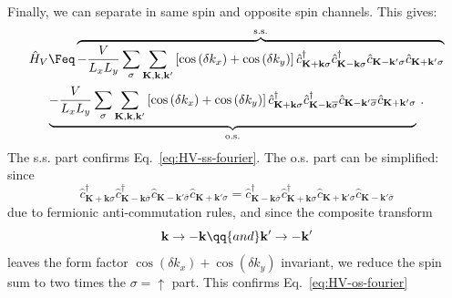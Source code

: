 \begin{tabproof}
	Finally, we can separate in same spin and opposite spin channels. This gives:
	\begin{multline*}
		\hat H_V \Feq 
		\overbrace{
			- \frac{V}{L_x L_y} \sum_{\sigma}
			\sum_{\mathbf{K}, \mathbf{k}, \mathbf{k}'} \left[
			\cos \left(
			\delta k_x
			\right)	+ \cos \left(
			\delta k_y
			\right)	
			\right]	\hat c_{\mathbf{K}+\mathbf{k} \sigma}^\dagger \hat c_{\mathbf{K}-\mathbf{k}\sigma}^\dagger \hat c_{\mathbf{K}-\mathbf{k}'\sigma} \hat c_{\mathbf{K}+\mathbf{k}'\sigma}
		}^{\mathrm{s.s.}} \\
		\underbrace{
			- \frac{V}{L_x L_y} \sum_{\sigma}
			\sum_{\mathbf{K}, \mathbf{k}, \mathbf{k}'} \left[
			\cos \left(
			\delta k_x
			\right)	+ \cos \left(
			\delta k_y
			\right)	
			\right]	\hat c_{\mathbf{K}+\mathbf{k} \sigma}^\dagger \hat c_{\mathbf{K}-\mathbf{k}\overline{\sigma}}^\dagger \hat c_{\mathbf{K}-\mathbf{k}'\overline{\sigma}} \hat c_{\mathbf{K}+\mathbf{k}'\sigma}
		}_{\mathrm{o.s.}} \, .
	\end{multline*}
	The s.s. part confirms Eq.~\eqref{eq:HV-ss-fourier}. The o.s. part can be simplified: since
	\[
		\hat c_{\mathbf{K}+\mathbf{k} \sigma}^\dagger \hat c_{\mathbf{K}-\mathbf{k}\overline{\sigma}}^\dagger \hat c_{\mathbf{K}-\mathbf{k}'\overline{\sigma}} \hat c_{\mathbf{K}+\mathbf{k}'\sigma} = \hat c_{\mathbf{K}-\mathbf{k}\overline{\sigma}}^\dagger \hat c_{\mathbf{K}+\mathbf{k} \sigma}^\dagger \hat c_{\mathbf{K}+\mathbf{k}'\sigma} \hat c_{\mathbf{K}-\mathbf{k}'\overline{\sigma}} 
	\]
	due to fermionic anti-commutation rules, and since the composite transform
	\[
		\mathbf{k} \to -\mathbf{k}
		\qq{and}
		\mathbf{k}' \to -\mathbf{k}'	
	\]
	leaves the form factor $\cos \left( \delta k_x \right)	+ \cos \left( \delta k_y \right)$ invariant, we reduce the spin sum to two times the $\sigma=\uparrow$ part. This confirms Eq.~\eqref{eq:HV-os-fourier}

\end{tabproof}

